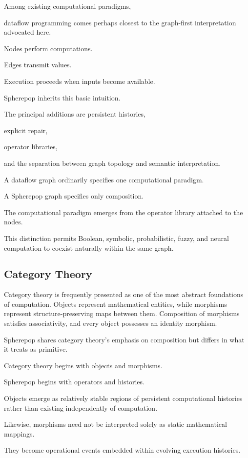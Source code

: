 \documentclass[12pt,oneside]{article}
\begin{document}
Among existing computational paradigms,

dataflow programming comes perhaps closest to the graph-first interpretation advocated here.

Nodes perform computations.

Edges transmit values.

Execution proceeds when inputs become available.

Spherepop inherits this basic intuition.

The principal additions are persistent histories,

explicit repair,

operator libraries,

and the separation between graph topology and semantic interpretation.

A dataflow graph ordinarily specifies one computational paradigm.

A Spherepop graph specifies only composition.

The computational paradigm emerges from the operator library attached to the nodes.

This distinction permits Boolean, symbolic, probabilistic, fuzzy, and neural computation to coexist naturally within the same graph.

\subsection{Category Theory}

Category theory is frequently presented as one of the most abstract foundations of computation. Objects represent mathematical entities, while morphisms represent structure-preserving maps between them. Composition of morphisms satisfies associativity, and every object possesses an identity morphism.

Spherepop shares category theory's emphasis on composition but differs in what it treats as primitive.

Category theory begins with objects and morphisms.

Spherepop begins with operators and histories.

Objects emerge as relatively stable regions of persistent computational histories rather than existing independently of computation.

Likewise, morphisms need not be interpreted solely as static mathematical mappings.

They become operational events embedded within evolving execution histories.
\end{document}
